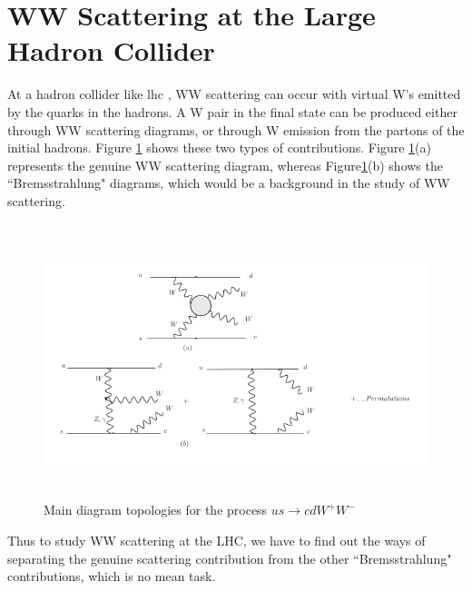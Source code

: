 \section{WW Scattering at the Large Hadron Collider}
At a hadron collider like {lhc} , WW scattering can occur with virtual W's emitted by the quarks in the hadrons. A W pair in the final state can be produced either through WW scattering diagrams, or through W emission from the partons of the initial hadrons. Figure \ref{wwscat} shows these two types of contributions. Figure \ref{wwscat}(a) represents the genuine WW scattering diagram, whereas Figure\ref{wwscat}(b) shows the ``Bremsstrahlung" diagrams, which would be a background in the study of WW scattering.\cite{book:PhyAtLHCdebjo} 
\begin{figure}[htb]
	\begin{center}
		\includegraphics[width=16.0cm,height=8cm]{figures/VBS/ww_scat.png}
		\caption{Main diagram topologies for the process $us \rightarrow cdW^+W^-$}
		\label{wwscat}
	\end{center}
\end{figure} 
Thus to study WW scattering at the LHC, we have to find out the ways of separating the genuine scattering contribution from the other ``Bremsstrahlung" contributions, which is no mean task. 
